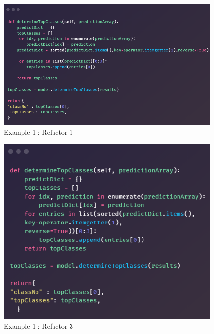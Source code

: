    \begin{figure}[H]
     \begin{center}
       \includegraphics[scale=0.55]{Images/Refactor/refactorA2}
       \caption{Example 1 : Refactor 1}
       \label{fig:refactorA2}
     \end{center}
   \end{figure}

   \begin{figure}[H]
     \begin{center}
       \includegraphics[scale=0.55]{Images/Refactor/refactorA3}
       \caption{Example 1 : Refactor 3}
       \label{fig:refactorA3}
     \end{center}
   \end{figure}

